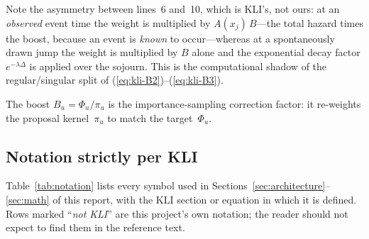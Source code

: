 \documentclass[11pt,leqno]{article}
\theoremstyle{plain}
\theoremstyle{definition}
\begin{document}
Note the asymmetry between lines~6 and~10, which is KLI's, not ours: at
an \emph{observed} event time the weight is multiplied by
$A(x_j)\,B$---the total hazard times the boost, because an event is
\emph{known} to occur---whereas at a spontaneously drawn jump the
weight is multiplied by $B$ alone and the exponential decay factor
$e^{-\lambda \Delta}$ is applied over the sojourn.  This is the
computational shadow of the regular/singular split of
(\ref{eq:kli-B2})--(\ref{eq:kli-B3}).

The boost $B_u = \Phi_u / \pi_u$ is the importance-sampling correction
factor: it re-weights the proposal kernel~$\pi_u$ to match the
target~$\Phi_u$.

\subsection{Notation strictly per KLI}
\label{sec:notation}

Table~\ref{tab:notation} lists every symbol used in
Sections~\ref{sec:architecture}--\ref{sec:math} of this report, with
the KLI section or equation in which it is defined.  Rows marked
``\emph{not KLI}'' are this project's own notation; the reader should
not expect to find them in the reference text.
\end{document}
